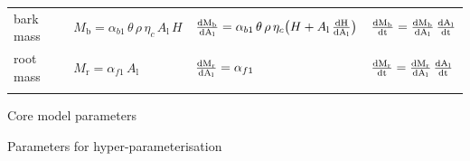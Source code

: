 \documentclass[10pt,twoside]{article}
\begin{document}
\begin{table}[h!]
\begin{tabular}{p{2.5cm}p{3.5cm}p{5cm}p{4cm} }
  bark mass &
    $M_\textrm{b} = \alpha_{b1} \, \theta \, \rho \, \eta_c \, A_\textrm{l} \, H $ &
    $\frac{\rm{d}M_\textrm{b}}{\rm{d}A_\textrm{l}} = \alpha_{b1} \, \theta \, \rho \, \eta_c\big(H + A_\textrm{l} \, \frac{\rm{d}H}{\rm{d}A_\textrm{l}} \big)$ &
    $\frac{\rm{d}M_\textrm{b}}{\rm{d}t} = \frac{\rm{d}M_\textrm{b}}{\rm{d}A_\textrm{l}} \, \frac{\rm{d}A_\textrm{l}}{\rm{d}t}$ \\
  root mass &
    $M_\textrm{r} = \alpha_{f1} \, A_\textrm{l}$ &
    $\frac{\rm{d}M_\textrm{r}}{\rm{d}A_\textrm{l}} = \alpha_{f1}$  &
    $\frac{\rm{d}M_\textrm{r}}{\rm{d}t} = \frac{\rm{d}M_\textrm{r}}{\rm{d}A_\textrm{l}} \, \frac{\rm{d}A_\textrm{l}}{\rm{d}t}$ \\
  \hline \\
\end{tabular}
\label{tab:allometry}
\end{table}

\newpage

\begin{table}[h!]
\caption{Core model parameters}

\label{tab:params_core}
\end{table}

\begin{table}[h!]
\caption{Parameters for hyper-parameterisation}

\label{tab:params_hyper}
\end{table}

\clearpage


\end{document}
